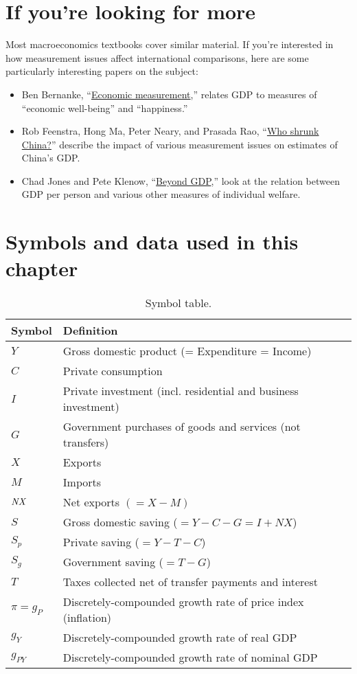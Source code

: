 \section*{If you're looking for more}

Most macroeconomics textbooks cover similar material.
If you're interested in how measurement issues affect
international comparisons, here are some 
particularly interesting papers on the subject:
%
\begin{itemize}
\item Ben Bernanke,
``\href{http://www.federalreserve.gov/newsevents/speech/bernanke20120806a.htm}{Economic measurement},''
    relates GDP to measures of ``economic well-being'' and ``happiness.''

\item Rob Feenstra, Hong Ma, Peter Neary, and Prasada Rao,
``\href{http://papers.nber.org/papers/w17729}{Who shrunk China?}''
describe the impact of various measurement issues on
estimates of China's GDP.

\item Chad Jones and Pete Klenow,
``\href{http://klenow.com/Jones_Klenow.pdf}{Beyond GDP},''
look at the relation between GDP per person and
various other measures of individual welfare.
\end{itemize}


\section*{Symbols and data used in this chapter}

\begin{table}[H]
\centering
\caption{Symbol table.}
\begin{tabular*}{0.99\textwidth}{l@{\extracolsep{\fill}}l}
\toprule
Symbol &  Definition\\
\midrule
$Y$        &Gross domestic product (= Expenditure = Income)\\
$C$        &Private consumption\\
$I$        &Private investment (incl. residential and business investment)\\
$G$        &Government purchases of goods and services (not transfers)\\
$X$        &Exports\\
$M$        &Imports\\
$\mbox{\em NX\/}$    &Net exports $(=X-M)$\\
$S$        &Gross domestic saving ($=Y-C-G=I+NX$)\\
$S_p$    &Private saving ($=Y-T-C$)\\
$S_g$    &Government saving ($=T-G$)\\
$T$        &Taxes collected net of transfer payments and interest\\
$ \pi = g_{P}$    &Discretely-compounded growth rate of price index (inflation)\\
$ g_{Y}$    &Discretely-compounded growth rate of real GDP\\
$ g_{PY}$    &Discretely-compounded growth rate of nominal GDP\\
\bottomrule
\end{tabular*}
\end{table}



